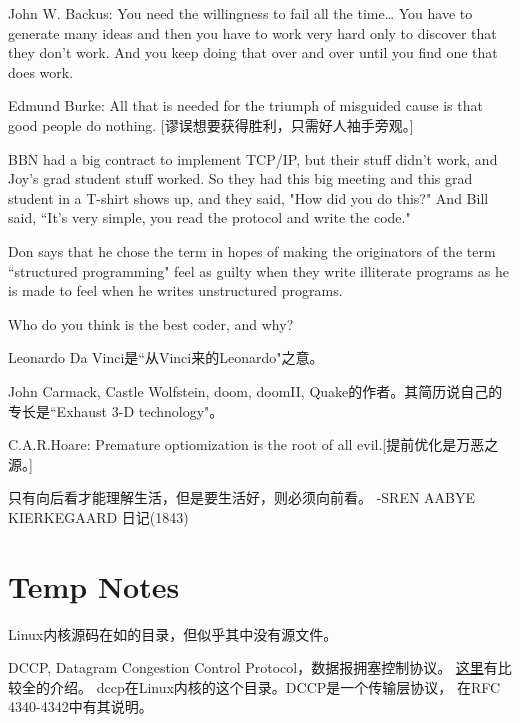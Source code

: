 John W. Backus: You need the willingness to fail all the time\ldots{} You have to generate
many ideas and then you have to work very hard only to discover that they don't work.
And you keep doing that over and over until you find one that does work.

Edmund Burke: All that is needed for the triumph of misguided cause is that good people do nothing.
[谬误想要获得胜利，只需好人袖手旁观。]

BBN had a big contract to implement TCP/IP, but their stuff didn't work, and Joy's grad student
stuff worked. So they had this big meeting and this grad student in a T-shirt shows up, and they said,
"How did you do this?" And Bill said, ``It's very simple, you read the protocol and write the code."

Don says that he chose the term in hopes of making the originators of the term ``structured programming"
feel as guilty when they write illiterate programs as he is made to feel when he writes unstructured programs.

Who do you think is the best coder, and why?

Leonardo Da Vinci是``从Vinci来的Leonardo"之意。

John Carmack, Castle Wolfstein, doom, doomII, Quake的作者。其简历说自己的专长是``Exhaust 3-D technology"。

C.A.R.Hoare: Premature optiomization is the root of all evil.[提前优化是万恶之源。]

只有向后看才能理解生活，但是要生活好，则必须向前看。 -SREN AABYE KIERKEGAARD 日记(1843)

\chapter{Temp Notes}

Linux内核源码在如的目录，但似乎其中没有源文件。

DCCP, Datagram Congestion Control Protocol，数据报拥塞控制协议。
\href{http://www.linuxfoundation.org/en/Net:DCCP}{这里}有比较全的介绍。
dccp在Linux内核的这个目录。DCCP是一个传输层协议，
在RFC 4340-4342中有其说明。

